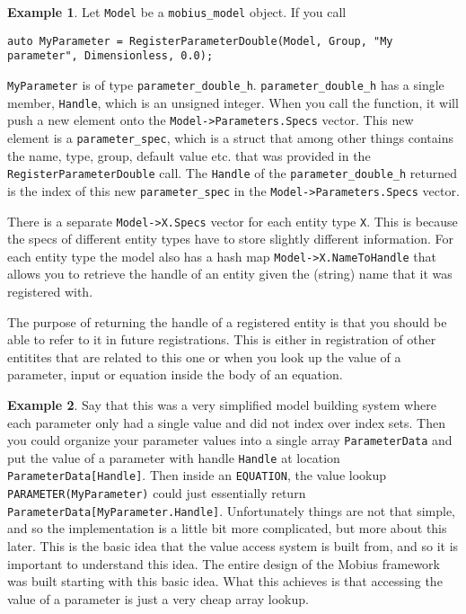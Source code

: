 \documentclass[11pt]{article}
\theoremstyle{definition}
\newtheorem{myexample}{Example}
\newenvironment{example}%
  {\begin{lrbox}{\examplebox}%
   \begin{minipage}{\dimexpr\linewidth-2\fboxsep}
   \begin{myexample}}%
  {\end{myexample}%
   \end{minipage}%
   \end{lrbox}%
   \begin{trivlist}
     \item[]\colorbox{silver}{\usebox\examplebox}
   \end{trivlist}}
\begin{document}
\begin{example}
Let {\tt Model} be a {\tt mobius\_model} object. If you call
\begin{lstlisting}[style=mycpp]
auto MyParameter = RegisterParameterDouble(Model, Group, "My parameter", Dimensionless, 0.0);
\end{lstlisting}
{\tt MyParameter} is of type {\tt parameter\_double\_h}. {\tt parameter\_double\_h} has a single member, {\tt Handle}, which is an unsigned integer. When you call the function, it will push a new element onto the {\tt Model->Parameters.Specs} vector. This new element is a {\tt parameter\_spec}, which is a struct that among other things contains the name, type, group, default value etc. that was provided in the {\tt RegisterParameterDouble} call. The {\tt Handle} of the {\tt parameter\_double\_h} returned is the index of this new {\tt parameter\_spec} in the {\tt Model->Parameters.Specs} vector.
\end{example}

There is a separate {\tt Model->X.Specs} vector for each entity type {\tt X}. This is because the specs of different entity types have to store slightly different information. For each entity type the model also has a hash map {\tt Model->X.NameToHandle} that allows you to retrieve the handle of an entity given the (string) name that it was registered with.

The purpose of returning the handle of a registered entity is that you should be able to refer to it in future registrations. This is either in registration of other entitites that are related to this one or when you look up the value of a parameter, input or equation inside the body of an equation.

\begin{example}
Say that this was a very simplified model building system where each parameter only had a single value and did not index over index sets. Then you could organize your parameter values into a single array {\tt ParameterData} and put the value of a parameter with handle {\tt Handle} at location {\tt ParameterData[Handle]}. Then inside an {\tt EQUATION}, the value lookup {\tt PARAMETER(MyParameter)} could just essentially return {\tt ParameterData[MyParameter.Handle]}. Unfortunately things are not that simple, and so the implementation is a little bit more complicated, but more about this later. This is the basic idea that the value access system is built from, and so it is important to understand this idea. The entire design of the Mobius framework was built starting with this basic idea. What this achieves is that accessing the value of a parameter is just a very cheap array lookup.
\end{example}
\end{document}
